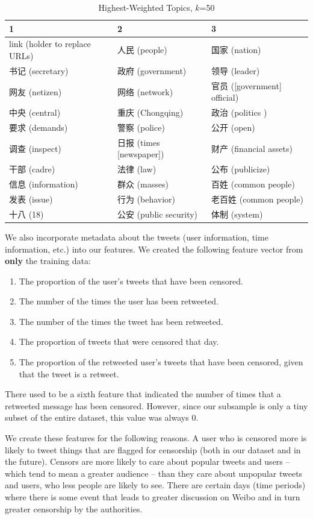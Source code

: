 \documentclass{sig-alternate-05-2015}
\begin{document}
\begin{table}
  \centering
  \begin{tabular}{l|l|l}
    1 & 2 & 3 \\
    \hline
    link (holder to replace URLs) & 人民 (people) & 国家 (nation) \\
    书记 (secretary) & 政府 (government) & 领导 (leader) \\
    网友 (netizen) & 网络 (network) & 官员 ([government] official)\\
    中央 (central) & 重庆 (Chongqing) & 政治 (politics )\\
    要求 (demands) & 警察 (police) & 公开 (open) \\
    调查 (inspect) & 日报 (times [newspaper]) & 财产 (financial assets) \\
    干部 (cadre) & 法律 (law) & 公布 (publicize) \\
    信息 (information) & 群众 (masses) & 百姓 (common people)\\
    发表 (issue) & 行为 (behavior) & 老百姓 (common people) \\
    十八 (18) & 公安 (public security) & 体制 (system) 
  \end{tabular}
  \caption{Highest-Weighted Topics, $k$=50}
  \label{tab:lda}
\end{table}


We also incorporate metadata about the tweets (user information, time information, etc.) into our features. We created the following feature vector from \textbf{only} the training data:
\begin{enumerate}
\item The proportion of the user's tweets that have been censored.
\item The number of the times the user has been retweeted.
\item The number of the times the tweet has been retweeted.
\item The proportion of tweets that were censored that day.
\item The proportion of the retweeted user's tweets that have been censored, given that the tweet is a retweet.
\end{enumerate}
There used to be a sixth feature that indicated the number of times that a retweeted message has been censored. However, since our subsample is only a tiny subset of the entire dataset, this value was always 0.

We create these features for the following reasons. A user who is censored more is likely to tweet things that are flagged for censorship (both in our dataset and in the future). Censors are more likely to care about popular tweets and users -- which tend to mean a greater audience -- than they care about unpopular tweets and users, who less people are likely to see. There are certain days (time periods) where there is some event that leads to greater discussion on Weibo and in turn greater censorship by the authorities. 
\end{document}
